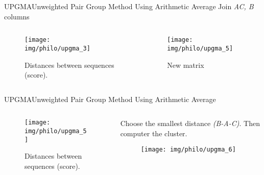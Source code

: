 \documentclass[10pt]{beamer}
\newcommand{\1}{
	\setbeamertemplate{background}{
		\texttt{[image: img/1]}
		\tikz[overlay] \fill[fill opacity=0.75,fill=white] (0,0) rectangle (-\paperwidth,\paperheight);
	}
}
\begin{document}
\begin{frame}{UPGMA}{Unweighted Pair Group Method Using Arithmetic Average}
	Join \textit{AC, B} columns
	\begin{columns}
		\begin{column}{0.48\textwidth}
			\begin{figure}
				\texttt{[image: img/philo/upgma\_3]}
				\caption{Distances between sequences (score).}
			\end{figure}
		\end{column}
		\begin{column}{0.48\textwidth}	
			\begin{figure}
				\texttt{[image: img/philo/upgma\_5]}
				\caption{New matrix}
			\end{figure}			
		\end{column}
	\end{columns}
	
\end{frame}



\begin{frame}{UPGMA}{Unweighted Pair Group Method Using Arithmetic Average}
	\begin{columns}
		\begin{column}{0.48\textwidth}
			\begin{figure}
				\texttt{[image: img/philo/upgma\_5]}
				\caption{Distances between sequences (score).}
			\end{figure}
		\end{column}
		\begin{column}{0.48\textwidth}
			
			Choose the smallest distance \textit{(B-A-C)}. Then computer the cluster.\\ 					
			
			\begin{figure}
				\texttt{[image: img/philo/upgma\_6]}
			\end{figure}
			
		\end{column}
	\end{columns}
	
\end{frame}
\end{document}
